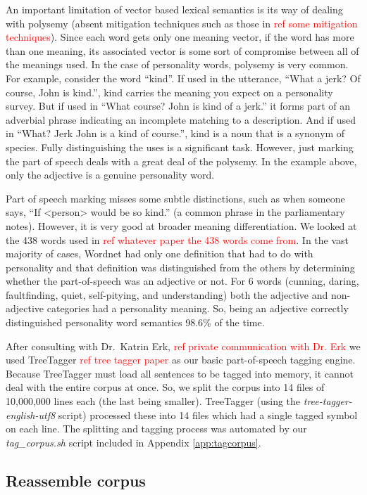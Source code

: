 \documentclass[10pt,letterpaper]{book}
\newcommand{\todo}[1]{\textcolor{red}{#1}}
\newcommand{\filename}[1]{\textit{#1}}
\begin{document}
An important limitation of vector based lexical semantics is its way of dealing with polysemy (absent mitigation techniques such as those in \todo{ref some mitigation techniques}). Since each word gets only one meaning vector, if the word has more than one meaning, its associated vector is some sort of compromise between all of the meanings used. In the case of personality words, polysemy is very common. For example, consider the word ``kind''. If used in the utterance, ``What a jerk? Of course, John is kind.'', kind carries the meaning you expect on a personality survey. But if used in ``What course? John is kind of a jerk.'' it forms part of an adverbial phrase indicating an incomplete matching to a description. And if used in ``What? Jerk John is a kind of course.'', kind is a noun that is a synonym of species. Fully distinguishing the uses is a significant task. However, just marking the part of speech deals with a great deal of the polysemy. In the example above, only the adjective is a genuine personality word. 

Part of speech marking misses some subtle distinctions, such as when someone says, ``If <person> would be so kind.'' (a common phrase in the parliamentary notes). However, it is very good at broader meaning differentiation. We looked at the 438 words used in \todo{ref whatever paper the 438 words come from}. In the vast majority of cases, Wordnet had only one definition that had to do with personality and that definition was distinguished from the others by determining whether the part-of-speech was an adjective or not. For 6 words (cunning, daring, faultfinding, quiet, self-pitying, and understanding) both the adjective and non-adjective categories had a personality meaning. So, being an adjective correctly distinguished personality word semantics 98.6\% of the time.

After consulting with Dr.\ Katrin Erk, \todo{ref private communication with Dr. Erk} we used TreeTagger \todo{ref tree tagger paper} as our basic part-of-speech tagging engine. Because TreeTagger must load all sentences to be tagged into memory, it cannot deal with the entire corpus at once. So, we split the corpus into 14 files of 10,000,000 lines each (the last being smaller). TreeTagger (using the \filename{tree-tagger-english-utf8} script) processed these into 14 files which had a single tagged symbol on each line. The splitting and tagging process was automated by our \filename{tag\_corpus.sh} script included in Appendix \ref{app:tagcorpus}.

\subsection{Reassemble corpus}
\end{document}
